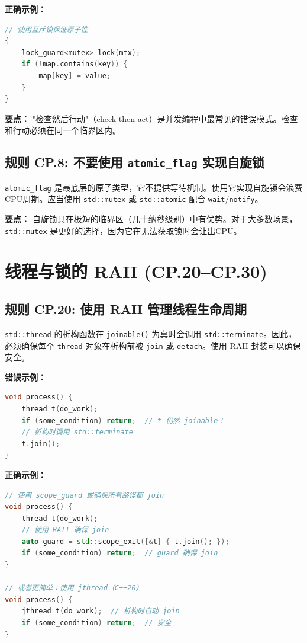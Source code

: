\textbf{正确示例：}

\begin{lstlisting}[language=C++]
// 使用互斥锁保证原子性
{
    lock_guard<mutex> lock(mtx);
    if (!map.contains(key)) {
        map[key] = value;
    }
}
\end{lstlisting}

\textbf{要点：} "检查然后行动"（check-then-act）是并发编程中最常见的错误模式。检查和行动必须在同一个临界区内。

\subsection*{\textbf{规则 CP.8:} 不要使用 \texttt{atomic\_flag} 实现自旋锁}

\texttt{atomic\_flag} 是最底层的原子类型，它不提供等待机制。使用它实现自旋锁会浪费CPU周期。应当使用 \texttt{std::mutex} 或 \texttt{std::atomic} 配合 \texttt{wait}/\allowbreak{}\texttt{notify}。

\textbf{要点：} 自旋锁只在极短的临界区（几十纳秒级别）中有优势。对于大多数场景，\texttt{std::mutex} 是更好的选择，因为它在无法获取锁时会让出CPU。

\section{线程与锁的 RAII (CP.20--CP.30)}

\subsection*{\textbf{规则 CP.20:} 使用 RAII 管理线程生命周期}

\texttt{std::thread} 的析构函数在 \texttt{joinable()} 为真时会调用 \texttt{std::terminate}。因此，必须确保每个 \texttt{thread} 对象在析构前被 \texttt{join} 或 \texttt{detach}。使用 RAII 封装可以确保安全。

\textbf{错误示例：}

\begin{lstlisting}[language=C++]
void process() {
    thread t(do_work);
    if (some_condition) return;  // t 仍然 joinable！
    // 析构时调用 std::terminate
    t.join();
}
\end{lstlisting}

\textbf{正确示例：}

\begin{lstlisting}[language=C++]
// 使用 scope_guard 或确保所有路径都 join
void process() {
    thread t(do_work);
    // 使用 RAII 确保 join
    auto guard = std::scope_exit([&t] { t.join(); });
    if (some_condition) return;  // guard 确保 join
}

// 或者更简单：使用 jthread（C++20）
void process() {
    jthread t(do_work);  // 析构时自动 join
    if (some_condition) return;  // 安全
}
\end{lstlisting}

